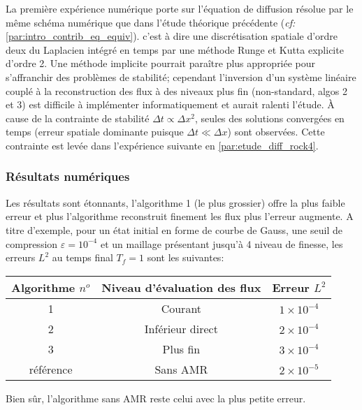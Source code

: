 La première expérience numérique porte sur l'équation de diffusion résolue par le même schéma numérique que dans l'étude théorique précédente (\textit{cf:} \ref{par:intro_contrib_eq_equiv}).
c'est à dire une discrétisation spatiale d'ordre deux du Laplacien intégré en temps par une méthode Runge et Kutta explicite d'ordre 2. 
Une méthode implicite pourrait paraître plus appropriée pour s'affranchir des problèmes de stabilité; cependant l'inversion d'un système linéaire couplé à 
la reconstruction des flux à des niveaux plus fin (non-standard, algos 2 et 3) est difficile à implémenter informatiquement et aurait ralenti l'étude.
À cause de la contrainte de stabilité $\Delta t \propto \Delta x^2$,
seules des solutions convergées en temps (erreur spatiale dominante puisque $\Delta t \ll \Delta x$) sont observées. Cette contrainte est levée dans l'expérience suivante en \ref{par:etude_diff_rock4}.\par 
\subsubsection{Résultats numériques}
Les résultats sont étonnants, l'algorithme 1 (le plus grossier) offre la plus faible erreur et plus l'algorithme reconstruit finement les flux plus l'erreur augmente. 
A titre d'exemple, pour un état initial en forme de courbe de Gauss, une seuil de compression $\varepsilon = 10^{-4}$ et un maillage présentant jusqu'à 4 niveau de finesse, les erreurs $L^2$ au temps final $T_f=1$ sont les suivantes:\par
\begin{center}\begin{tabular}{|c|c|c|}
\hline
Algorithme $n^o$ & Niveau d'évaluation des flux & Erreur $L^2$ \\
\hline
1 & Courant           & $1 \times 10^{-4}$ \\
2 & Inférieur direct  & $2 \times 10^{-4}$ \\
3 & Plus fin          & $3 \times 10^{-4}$ \\
référence & Sans AMR& $2 \times 10^{-5}$ \\
\hline
\end{tabular}\end{center}
Bien sûr, l'algorithme sans AMR reste celui avec la plus petite erreur.
